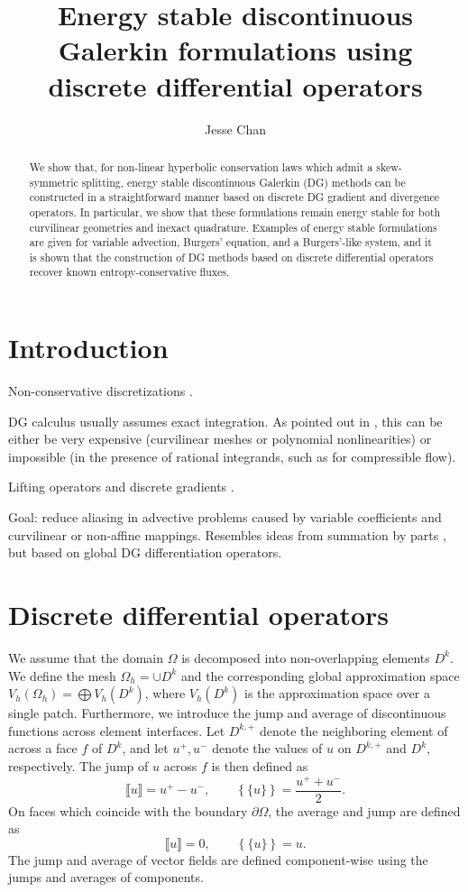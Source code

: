 \documentclass[preprint,10pt]{article}
\date{}
\author{Jesse Chan}
\title{Energy stable discontinuous Galerkin formulations using discrete differential operators}
\theoremstyle{definition}
\theoremstyle{lemma}
\newcommand{\LRp}[1]{\left( #1 \right)}
\newcommand{\LRc}[1]{\left\{ #1 \right\}}
\newcommand{\jump}[1] {\ensuremath{\llbracket#1\rrbracket}}
\newcommand{\avg}[1] {\ensuremath{\LRc{\!\{#1\}\!}}}
\begin{document}
\maketitle

\begin{abstract}
We show that, for non-linear hyperbolic conservation laws which admit a skew-symmetric splitting, energy stable discontinuous Galerkin (DG) methods can be constructed in a straightforward manner based on discrete DG gradient and divergence operators.  In particular, we show that these formulations remain energy stable for both curvilinear geometries and inexact quadrature.  Examples of energy stable formulations are given for variable advection, Burgers' equation, and a Burgers'-like system, and it is shown that the construction of DG methods based on discrete differential operators recover known entropy-conservative fluxes.  
\end{abstract}

\section{Introduction}

Non-conservative discretizations \cite{rhebergen2008discontinuous}.  

DG calculus \cite{feng2016discontinuous} usually assumes exact integration.  As pointed out in \cite{gassner2016split}, this can be either be very expensive (curvilinear meshes or polynomial nonlinearities) or impossible (in the presence of rational integrands, such as for compressible flow).  

Lifting operators and discrete gradients \cite{bassi1997high, di2011mathematical}.  

Goal: reduce aliasing in advective problems caused by variable coefficients and curvilinear or non-affine mappings.  Resembles ideas from summation by parts \cite{olsson1995summation1, olsson1995summation2, hicken2016multidimensional}, but based on global DG differentiation operators. 



\section{Discrete differential operators}

We assume that the domain $\Omega$ is decomposed into non-overlapping elements $D^k$.  We define the mesh $\Omega_h = \cup D^k$ and the corresponding global approximation space $V_h(\Omega_h) = \bigoplus V_h\LRp{D^k}$, where $V_h\LRp{D^k}$ is the approximation space over a single patch.  Furthermore, we introduce the jump and average of discontinuous functions across element interfaces.  Let $D^{k,+}$ denote the neighboring element of across a face $f$ of $D^k$, and let $u^+,u^-$ denote the values of $u$ on $D^{k,+}$ and $D^k$, respectively.  The jump of $u$ across $f$ is then defined as
\[
\jump{u} = u^+ - u^-, \qquad \avg{u} = \frac{u^+ + u^-}{2}.
\]
On faces which coincide with the boundary $\partial \Omega$, the average and jump are defined as
\[
\jump{u} = 0, \qquad \avg{u} = u.
\]
The jump and average of vector fields are defined component-wise using the jumps and averages of components.  
\end{document}
